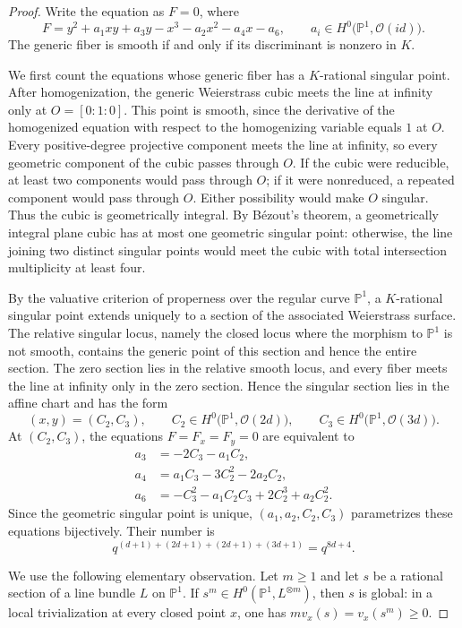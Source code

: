 \documentclass[a4paper,12pt]{amsart}
\theoremstyle{definition}
\newcommand{\Pb}{\mathbb{P}}
\begin{document}
\begin{proof}
Write the equation as $F=0$, where
\[
F
=
y^2+a_1xy+a_3y-x^3-a_2x^2-a_4x-a_6,
\qquad
a_i\in H^0\bigl(\Pb^1,\mathcal O(id)\bigr).
\]
The generic fiber is smooth if and only if its discriminant is nonzero in $K$.

We first count the equations whose generic fiber has a $K$-rational singular point.  After homogenization, the generic Weierstrass cubic meets the line at infinity only at $O=[0:1:0]$.  This point is smooth, since the derivative of the homogenized equation with respect to the homogenizing variable equals $1$ at $O$.  Every positive-degree projective component meets the line at infinity, so every geometric component of the cubic passes through $O$.  If the cubic were reducible, at least two components would pass through $O$; if it were nonreduced, a repeated component would pass through $O$.  Either possibility would make $O$ singular.  Thus the cubic is geometrically integral.  By B\'ezout's theorem, a geometrically integral plane cubic has at most one geometric singular point: otherwise, the line joining two distinct singular points would meet the cubic with total intersection multiplicity at least four.

By the valuative criterion of properness over the regular curve $\Pb^1$, a $K$-rational singular point extends uniquely to a section of the associated Weierstrass surface.  The relative singular locus, namely the closed locus where the morphism to $\Pb^1$ is not smooth, contains the generic point of this section and hence the entire section.  The zero section lies in the relative smooth locus, and every fiber meets the line at infinity only in the zero section.  Hence the singular section lies in the affine chart and has the form
\[
(x,y)=(C_2,C_3),
\qquad
C_2\in H^0\bigl(\Pb^1,\mathcal O(2d)\bigr),
\qquad
C_3\in H^0\bigl(\Pb^1,\mathcal O(3d)\bigr).
\]
At $(C_2,C_3)$, the equations $F=F_x=F_y=0$ are equivalent to
\[
\begin{aligned}
a_3&=-2C_3-a_1C_2,\\
a_4&=a_1C_3-3C_2^2-2a_2C_2,\\
a_6&=-C_3^2-a_1C_2C_3+2C_2^3+a_2C_2^2.
\end{aligned}
\]
Since the geometric singular point is unique, $(a_1,a_2,C_2,C_3)$ parametrizes these equations bijectively.  Their number is
\[
q^{(d+1)+(2d+1)+(2d+1)+(3d+1)}=q^{8d+4}.
\]

We use the following elementary observation.  Let $m\geq1$ and let $s$ be a rational section of a line bundle $L$ on $\Pb^1$.  If $s^m\in H^0(\Pb^1,L^{\otimes m})$, then $s$ is global: in a local trivialization at every closed point $x$, one has $m v_x(s)=v_x(s^m)\geq0$.


\end{proof}
\end{document}
